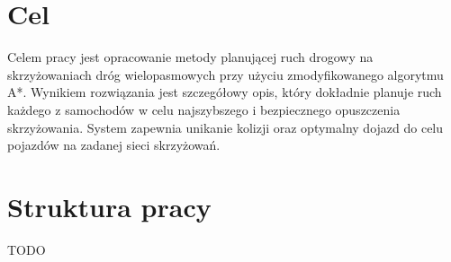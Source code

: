\section{Cel}

Celem pracy jest opracowanie metody planującej ruch drogowy na skrzyżowaniach dróg wielopasmowych przy użyciu zmodyfikowanego algorytmu A*. 
\newline
\newline
Wynikiem rozwiązania jest szczegółowy opis, który dokładnie planuje ruch każdego z samochodów w celu najszybszego i bezpiecznego opuszczenia skrzyżowania.
\newline
\newline
System zapewnia unikanie kolizji oraz optymalny dojazd do celu pojazdów na zadanej sieci skrzyżowań.

\section{Struktura pracy}
TODO
